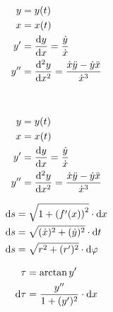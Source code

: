 \begin{boxleft}
\\
\end{boxleft}\begin{boxrightshaded}
\begin{align} 
y&=y(t)\\
x&=x(t)\\
y'&=\frac{\mathop{}\!\mathrm{d} y}{\mathop{}\!\mathrm{d} x}=\frac{\dot{y}}{\dot{x}}\\
y''&=\frac{\mathop{}\!\mathrm{d}^2 y}{\mathop{}\!\mathrm{d} x^2}=\frac{\dot{x}\ddot{y}-\dot{y}\ddot{x}}{\dot{x}^3}
\end{align}\end{boxrightshaded}

\begin{boxleft}
\\
\end{boxleft}\begin{boxrightshaded}
\begin{align} 
y&=y(t)\\
x&=x(t)\\
y'&=\frac{\mathop{}\!\mathrm{d} y}{\mathop{}\!\mathrm{d} x}=\frac{\dot{y}}{\dot{x}}\\
y''&=\frac{\mathop{}\!\mathrm{d}^2 y}{\mathop{}\!\mathrm{d} x^2}=\frac{\dot{x}\ddot{y}-\dot{y}\ddot{x}}{\dot{x}^3}
\end{align}\end{boxrightshaded}

\begin{boxleft}
\end{boxleft}\begin{boxrightshaded}
\begin{align} 
\mathop{}\!\mathrm{d} s&=\sqrt{1+\left(f'(x)\right)^2}\cdot \mathop{}\!\mathrm{d} x\\
\mathop{}\!\mathrm{d} s&=\sqrt{(\dot{x})^2+(\dot{y})^2}\cdot \mathop{}\!\mathrm{d} t\\
\mathop{}\!\mathrm{d} s&=\sqrt{r^2+(r')^2}\cdot \mathop{}\!\mathrm{d} \varphi
\end{align}\end{boxrightshaded}

\begin{boxleft}
\end{boxleft}\begin{boxrightshaded}
\begin{align} 
\tau&=\arctan y'\\
\mathop{}\!\mathrm{d} \tau&=\frac{y''}{1+(y')^2}\cdot \mathop{}\!\mathrm{d} x
\end{align}\end{boxrightshaded}

